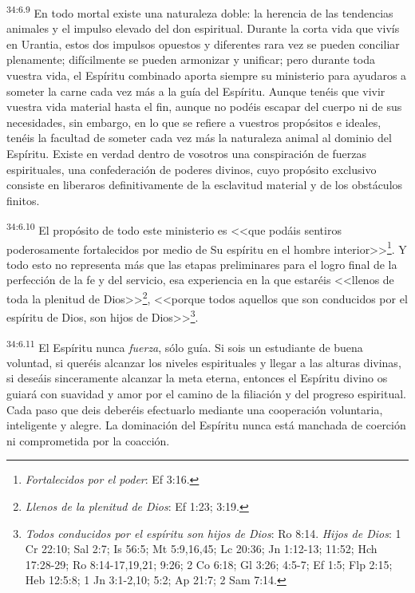 \par
\textsuperscript{34:6.9} En todo mortal existe una naturaleza doble: la herencia de las tendencias animales y el impulso elevado del don espiritual. Durante la corta vida que vivís en Urantia, estos dos impulsos opuestos y diferentes rara vez se pueden conciliar plenamente; difícilmente se pueden armonizar y unificar; pero durante toda vuestra vida, el Espíritu combinado aporta siempre su ministerio para ayudaros a someter la carne cada vez más a la guía del Espíritu. Aunque tenéis que vivir vuestra vida material hasta el fin, aunque no podéis escapar del cuerpo ni de sus necesidades, sin embargo, en lo que se refiere a vuestros propósitos e ideales, tenéis la facultad de someter cada vez más la naturaleza animal al dominio del Espíritu. Existe en verdad dentro de vosotros una conspiración de fuerzas espirituales, una confederación de poderes divinos, cuyo propósito exclusivo consiste en liberaros definitivamente de la esclavitud material y de los obstáculos finitos.

\par
\textsuperscript{34:6.10} El propósito de todo este ministerio es <<que podáis sentiros poderosamente fortalecidos por medio de Su espíritu en el hombre interior>>\footnote{\textit{Fortalecidos por el poder}: Ef 3:16.}. Y todo esto no representa más que las etapas preliminares para el logro final de la perfección de la fe y del servicio, esa experiencia en la que estaréis <<llenos de toda la plenitud de Dios>>\footnote{\textit{Llenos de la plenitud de Dios}: Ef 1:23; 3:19.}, <<porque todos aquellos que son conducidos por el espíritu de Dios, son hijos de Dios>>\footnote{\textit{Todos conducidos por el espíritu son hijos de Dios}: Ro 8:14. \textit{Hijos de Dios}: 1 Cr 22:10; Sal 2:7; Is 56:5; Mt 5:9,16,45; Lc 20:36; Jn 1:12-13; 11:52; Hch 17:28-29; Ro 8:14-17,19,21; 9:26; 2 Co 6:18; Gl 3:26; 4:5-7; Ef 1:5; Flp 2:15; Heb 12:5:8; 1 Jn 3:1-2,10; 5:2; Ap 21:7; 2 Sam 7:14.}.

\par
\textsuperscript{34:6.11} El Espíritu nunca \textit{fuerza}, sólo guía. Si sois un estudiante de buena voluntad, si queréis alcanzar los niveles espirituales y llegar a las alturas divinas, si deseáis sinceramente alcanzar la meta eterna, entonces el Espíritu divino os guiará con suavidad y amor por el camino de la filiación y del progreso espiritual. Cada paso que deis deberéis efectuarlo mediante una cooperación voluntaria, inteligente y alegre. La dominación del Espíritu nunca está manchada de coerción ni comprometida por la coacción.

